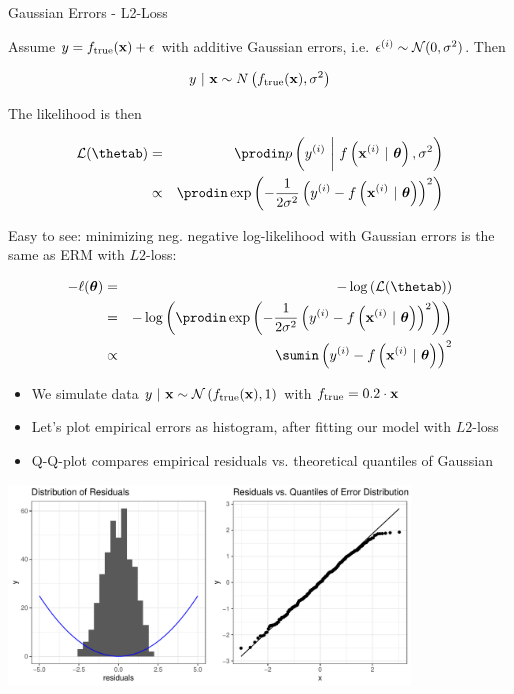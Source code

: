 \documentclass[11pt,compress,t,notes=noshow, xcolor=table]{beamer}
\begin{document}
\begin{vbframe}{Gaussian Errors - L2-Loss} 

Assume $y = f_{\text{true}}(\mathbf{x}) + \epsilon$ with additive Gaussian errors, i.e. $\epsilon^{(i)} \sim \mathcal{N}(0, \sigma^2)$. Then

$$y~|~\mathbf{x} \sim N\left(f_{\text{true}}(\mathbf{x}), \sigma^2\right)$$


The likelihood is then 

\begin{eqnarray*}
\LL(\thetab) &=& \prodin \pdf\left(\yi ~\bigg|~ \fxit, \sigma^2\right) \\ &\propto& \prodin \exp\left(-\frac{1}{2\sigma^2} \left(\yi - \fxit\right)^2\right)
\end{eqnarray*}

\framebreak 

Easy to see: minimizing neg. negative log-likelihood with Gaussian errors is the same as ERM with $L2$-loss:

\begin{eqnarray*}
- \loglt &=& - \log\left(\LL(\thetab)\right) \\
&=& - \log\left(\prodin \exp\left(-\frac{1}{2\sigma^2} \left(\yi - \fxit\right)^2\right)\right) \\
&\propto& \sumin \left(\yi - \fxit\right)^2
\end{eqnarray*}



\framebreak 

\begin{footnotesize}
\begin{itemize}
	\item We simulate data $y ~|~\mathbf{x} \sim \mathcal{N}\left(f_{\text{true}}(\mathbf{x}), 1\right)$ with $f_{\text{true}} = 0.2 \cdot \mathbf{x}$ 
\item Let's plot empirical errors as histogram, after fitting our model with $L2$-loss
\item Q-Q-plot compares empirical residuals vs. theoretical quantiles of Gaussian 
\end{itemize}
\end{footnotesize}

\includegraphics[width = 0.8\textwidth]{figure/residuals_plot_L2.pdf}

\end{vbframe}
\end{document}
